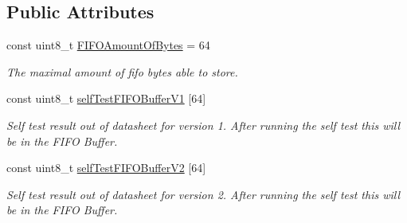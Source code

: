 \subsection*{Public Attributes}
\begin{DoxyCompactItemize}
\item 
\mbox{\label{classMFRC522_a56c8309a003cf1a5d8479c7783826f8e}} 
const uint8\+\_\+t \hyperlink{classMFRC522_a56c8309a003cf1a5d8479c7783826f8e}{F\+I\+F\+O\+Amount\+Of\+Bytes} = 64
\begin{DoxyCompactList}\small\item\em The maximal amount of fifo bytes able to store. \end{DoxyCompactList}\item 
const uint8\+\_\+t \hyperlink{classMFRC522_a7d19c9869a7fbbe0d9825d5653d6af7b}{self\+Test\+F\+I\+F\+O\+Buffer\+V1} \mbox{[}64\mbox{]}
\begin{DoxyCompactList}\small\item\em Self test result out of datasheet for version 1. After running the self test this will be in the F\+I\+FO Buffer. \end{DoxyCompactList}\item 
const uint8\+\_\+t \hyperlink{classMFRC522_a6973b73a8a922ac09b9d89489bdbc333}{self\+Test\+F\+I\+F\+O\+Buffer\+V2} \mbox{[}64\mbox{]}
\begin{DoxyCompactList}\small\item\em Self test result out of datasheet for version 2. After running the self test this will be in the F\+I\+FO Buffer. \end{DoxyCompactList}\end{DoxyCompactItemize}
